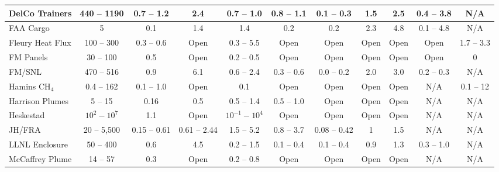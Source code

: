 \begin{landscape}
\begin{longtable}{|l|c|c|c|c|c|c|c|c|c|c|}
DelCo Trainers      & 440 -- 1190   & 0.7 -- 1.2    & 2.4   & 0.7 -- 1.0        & 0.8 -- 1.1          & 0.1 -- 0.3    & 1.5         & 2.5         & 0.4 -- 3.8            & N/A                   \\ \hline
FAA Cargo           & 5             & 0.1           & 1.4   & 1.4               & 0.2                 & 0.2           & 2.3         & 4.8         & 0.1 -- 4.8            & N/A                   \\ \hline
Fleury Heat Flux    & 100 -- 300    & 0.3 -- 0.6    & Open  & 0.3 -- 5.5        & Open                & Open          & Open        & Open        & Open                  & 1.7 -- 3.3            \\ \hline
FM Panels           & 30 -- 100     & 0.5           & Open  & 0.2 -- 0.5        & Open                & Open          & Open        & Open        & Open                  & 0                     \\ \hline
FM/SNL              & 470 -- 516    & 0.9           & 6.1   & 0.6 -- 2.4        & 0.3 -- 0.6          & 0.0 -- 0.2    & 2.0         & 3.0         & 0.2 -- 0.3            & N/A                   \\ \hline
Hamins CH$_4$       & 0.4 -- 162    & 0.1 -- 1.0    & Open  & 0.1               & Open                & Open          & Open        & Open        & N/A                   & 0.1 -- 12             \\ \hline
Harrison Plumes     & 5 -- 15       & 0.16          & 0.5   & 0.5 -- 1.4        & 0.5 -- 1.0          & Open          & Open        & Open        & N/A                   & N/A                   \\ \hline
Heskestad           & $10^2-10^7$   & 1.1           & Open  & $10^{-1}-10^4$    & Open                & Open          & Open        & Open        & N/A                   & N/A                   \\ \hline
JH/FRA              & 20 -- 5,500   & 0.15 -- 0.61  & 0.61 -- 2.44 & 1.5 -- 5.2 & 0.8 -- 3.7          & 0.08 -- 0.42  & 1           & 1.5         & N/A                   & N/A                   \\ \hline
LLNL Enclosure      & 50 -- 400     & 0.6           & 4.5   & 0.2 -- 1.5        & 0.1 -- 0.4          & 0.1 -- 0.4    & 0.9         & 1.3         & 0.3 -- 1.0            & N/A                   \\ \hline
McCaffrey Plume     & 14 -- 57      & 0.3           & Open  & 0.2 -- 0.8        & Open                & Open          & Open        & Open        & N/A                   & N/A                   \\ \hline

\end{longtable}
\end{landscape}
